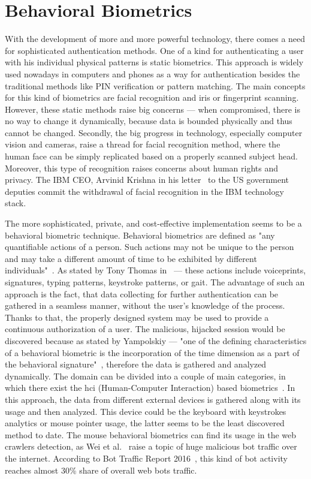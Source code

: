 \section{Behavioral Biometrics}\label{sec:behavioral-biometrics}
With the development of more and more powerful technology, there comes a need for sophisticated authentication methods.
One of a kind for authenticating a user with his individual physical patterns is static biometrics.
This approach is widely used nowadays in computers and phones as a way for authentication besides the traditional methods like PIN verification or pattern matching.
The main concepts for this kind of biometrics are facial recognition and iris or fingerprint scanning.
However, these static methods raise big concerns --- when compromised, there is no way to change it dynamically, because data is bounded physically and thus cannot be changed.
Secondly, the big progress in technology, especially computer vision and cameras, raise a thread for facial recognition method, where the human face can be simply replicated based on a properly scanned subject head.
Moreover, this type of recognition raises concerns about human rights and privacy.
The IBM CEO, Arvinid Krishna in his letter~\cite{ibm_2020} to the US government deputies commit the withdrawal of facial recognition in the IBM technology stack.

The more sophisticated, private, and cost-effective implementation seems to be a behavioral biometric technique.
Behavioral biometrics are defined as "any quantifiable actions of a person.
Such actions may not be unique to the person and may take a different amount of time to be exhibited by different individuals"~\cite{Yampolskiy2011}.
As stated by Tony Thomas in~\cite{thomas2020machine} --- these actions include voiceprints, signatures, typing patterns, keystroke patterns, or gait.
The advantage of such an approach is the fact, that data collecting for further authentication can be gathered in a seamless manner, without the user's knowledge of the process.
Thanks to that, the properly designed system may be used to provide a continuous authorization of a user.
The malicious, hijacked session would be discovered because as stated by Yampolskiy --- "one of the defining characteristics of a behavioral biometric is the incorporation of the time dimension as a part of the behavioral signature"~\cite{Yampolskiy2011}, therefore the data is gathered and analyzed dynamically.
The domain can be divided into a couple of main categories, in which there exist the \gls{hci} (Human-Computer Interaction) based biometrics~\cite{Yampolskiy2011}.
In this approach, the data from different external devices is gathered along with its usage and then analyzed.
This device could be the keyboard with keystrokes analytics or mouse pointer usage, the latter seems to be the least discovered method to date.
The mouse behavioral biometrics can find its usage in the web crawlers detection, as Wei et al.~\cite{a-deep-learning-approach-to-web-bot-detection-using-mouse-behavioral-biometrics} raise a topic of huge malicious bot traffic over the internet. 
According to Bot Traffic Report 2016~\cite{bot-share-2016}, this kind of bot activity reaches almost 30\% share of overall web bots traffic.

